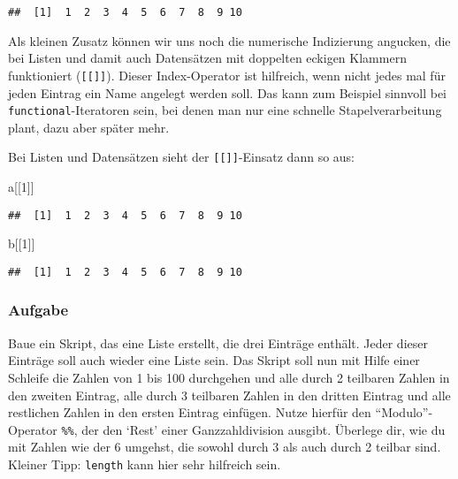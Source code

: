 \documentclass[
]{book}
\newenvironment{Shaded}{\begin{snugshade}}{\end{snugshade}}
\newcommand{\DecValTok}[1]{\textcolor[rgb]{0.00,0.00,0.81}{#1}}
\newcommand{\NormalTok}[1]{#1}
\newcommand{\SpecialCharTok}[1]{\textcolor[rgb]{0.00,0.00,0.00}{#1}}
\begin{document}
\begin{Shaded}
\end{Shaded}

\begin{verbatim}
##  [1]  1  2  3  4  5  6  7  8  9 10
\end{verbatim}

Als kleinen Zusatz können wir uns noch die numerische Indizierung angucken, die bei Listen und damit auch Datensätzen mit doppelten eckigen Klammern funktioniert (\texttt{{[}{[}{]}{]}}). Dieser Index-Operator ist hilfreich, wenn nicht jedes mal für jeden Eintrag ein Name angelegt werden soll. Das kann zum Beispiel sinnvoll bei \texttt{functional}-Iteratoren sein, bei denen man nur eine schnelle Stapelverarbeitung plant, dazu aber später mehr.

Bei Listen und Datensätzen sieht der \texttt{{[}{[}{]}{]}}-Einsatz dann so aus:

\begin{Shaded}
\begin{Highlighting}[]
\NormalTok{a[[}\DecValTok{1}\NormalTok{]]}
\end{Highlighting}
\end{Shaded}

\begin{verbatim}
##  [1]  1  2  3  4  5  6  7  8  9 10
\end{verbatim}

\begin{Shaded}
\begin{Highlighting}[]
\NormalTok{b[[}\DecValTok{1}\NormalTok{]]}
\end{Highlighting}
\end{Shaded}

\begin{verbatim}
##  [1]  1  2  3  4  5  6  7  8  9 10
\end{verbatim}

\hypertarget{aufgabe-7}{%
\subsubsection{Aufgabe}\label{aufgabe-7}}

Baue ein Skript, das eine Liste erstellt, die drei Einträge enthält.
Jeder dieser Einträge soll auch wieder eine Liste sein.
Das Skript soll nun mit Hilfe einer Schleife die Zahlen von 1 bis 100 durchgehen und alle durch 2 teilbaren Zahlen in den zweiten Eintrag, alle durch 3 teilbaren Zahlen in den dritten Eintrag und alle restlichen Zahlen in den ersten Eintrag einfügen.
Nutze hierfür den ``Modulo''-Operator \texttt{\%\%}, der den `Rest' einer Ganzzahldivision ausgibt.
Überlege dir, wie du mit Zahlen wie der 6 umgehst, die sowohl durch 3 als auch durch 2 teilbar sind.
Kleiner Tipp: \texttt{length} kann hier sehr hilfreich sein.
\end{document}
